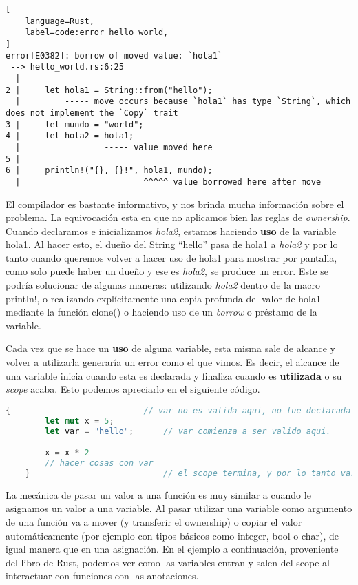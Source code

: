 \begin{lstlisting}[
    language=Rust,
    label=code:error_hello_world,
]
error[E0382]: borrow of moved value: `hola1`
 --> hello_world.rs:6:25
  |
2 |     let hola1 = String::from("hello");
  |         ----- move occurs because `hola1` has type `String`, which does not implement the `Copy` trait
3 |     let mundo = "world";
4 |     let hola2 = hola1;
  |                 ----- value moved here
5 |
6 |     println!("{}, {}!", hola1, mundo);
  |                         ^^^^^ value borrowed here after move
\end{lstlisting}

El compilador es bastante informativo, y nos brinda mucha información sobre el problema. La equivocación esta en que no aplicamos bien las reglas de \textit{ownership}. Cuando declaramos e inicializamos \textit{hola2}, estamos haciendo \textbf{uso} de la variable hola1. Al hacer esto, el dueño del String ``hello'' pasa de hola1 a \textit{hola2} y por lo tanto cuando queremos volver a hacer uso de hola1 para mostrar por pantalla, como solo puede haber un dueño y ese es \textit{hola2}, se produce un error. Este se podría solucionar de algunas maneras: utilizando \textit{hola2} dentro de la macro println!, o realizando explícitamente una copia profunda del valor de hola1 mediante la función clone() o haciendo uso de un \textit{borrow} o préstamo de la variable.

Cada vez que se hace un \textbf{uso} de alguna variable, esta misma sale de alcance y volver a utilizarla generaría un error como el que vimos. Es decir, el alcance de una variable inicia cuando esta es declarada y finaliza cuando es \textbf{utilizada} o su \textit{scope} acaba. Esto podemos apreciarlo en el siguiente código.

\begin{lstlisting}[language=Rust]
    {                           // var no es valida aqui, no fue declarada todavia
        let mut x = 5;
        let var = "hello";      // var comienza a ser valido aqui.

        x = x * 2
        // hacer cosas con var
    }                           // el scope termina, y por lo tanto var no es mas valida
\end{lstlisting}


La mecánica de pasar un valor a una función es muy similar a cuando le asignamos un valor a una variable. Al pasar utilizar una variable como argumento de una función va a mover (y transferir el ownership) o copiar el valor automáticamente (por ejemplo con tipos básicos como integer, bool o char), de igual manera que en una asignación. En el ejemplo a continuación, proveniente del libro de Rust, podemos ver como  las variables entran y salen del scope al interactuar con funciones con las anotaciones.

